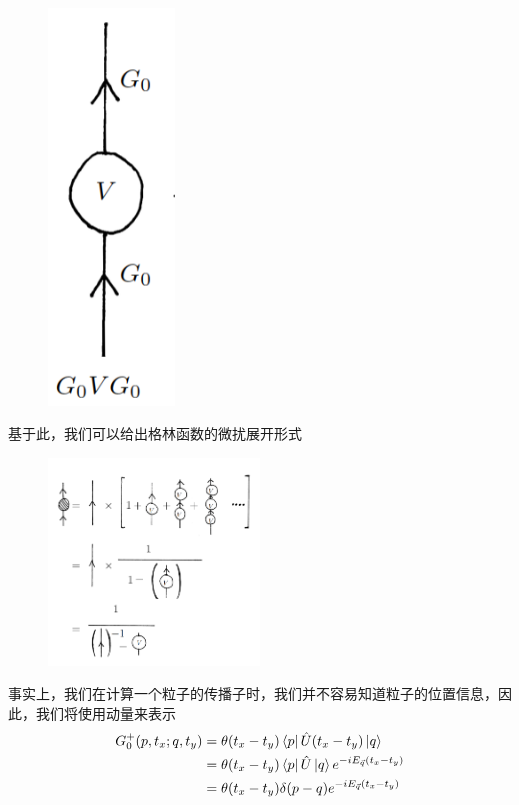 \documentclass{article}
\begin{document}
\begin{figure}[H]
\begin{minipage}{0.3\textwidth}
    \end{minipage}
    \hfill
    \begin{minipage}{0.3\textwidth}
        \centering
        \includegraphics[width = 0.3\textwidth]{figure/一阶微扰格林函数.png}
    \end{minipage}
\end{figure}

基于此，我们可以给出格林函数的微扰展开形式
\begin{figure}[hbpt]
    \centering
    \includegraphics[width = 0.5\textwidth]{figure/格林函数微扰展开.png}
\end{figure}





事实上，我们在计算一个粒子的传播子时，我们并不容易知道粒子的位置信息，因此，我们将使用动量来表示
\begin{align*}
    G^{+}_0(p,t_x;q,t_y) &= \theta(t_x - t_y) \bra{p}\hat{U}(t_x - t_y)\ket{q} \\
    &= \theta(t_x - t_y) \bra{p}\hat{U}\ket{q}e^{-iE_{\vec{q}}(t_x - t_y)} \\
    &= \theta(t_x - t_y) \delta(p - q)e^{-iE_{\vec{q}}(t_x - t_y)}
\end{align*}
\end{document}
